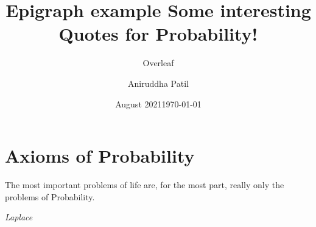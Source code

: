 \documentclass[11pt]{book}
\title{Epigraph example}
\author{Overleaf}
\date{August 2021}
\title{ \textbf{Some interesting Quotes for Probability!}}
\author{ Aniruddha Patil }
\date{\today}
\begin{document}
\frontmatter
\mainmatter
\maketitle










\chapter{Axioms of Probability}
\epigraph{The most important problems of life are, for the most part, really only the problems of Probability.}{\textit{Laplace}}
\end{document}
